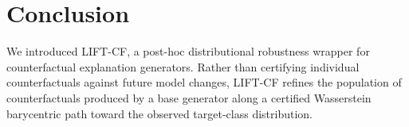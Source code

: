 
\section{Conclusion}
We introduced \textsc{LIFT-CF}, a post-hoc distributional robustness wrapper for counterfactual explanation generators. Rather than certifying individual counterfactuals against future model changes, \textsc{LIFT-CF} refines the population of counterfactuals produced by a base generator along a certified Wasserstein barycentric path toward the observed target-class distribution.
\newpage